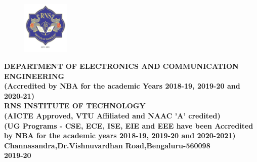 \begin{titlingpage}
\begin{figure}[h]
	\centering
	\includegraphics[height=2.5cm]{images/rns1.jpg}
\end{figure}

\begin{center}
\scriptsize\textbf{DEPARTMENT OF ELECTRONICS AND COMMUNICATION ENGINEERING}\\
\small\textbf{(Accredited by NBA for the academic Years 2018-19, 2019-20 and 2020-21)
\\
\vspace{0.5cm}
RNS INSTITUTE OF TECHNOLOGY\\
(AICTE Approved, VTU Affiliated and NAAC 'A' credited)\\
(UG Programs - CSE, ECE, ISE, EIE and EEE have been Accredited by NBA for the academic years 2018-19, 2019-20 and 2020-2021)\\
Channasandra,Dr.Vishnuvardhan Road,Bengaluru-560098\\
	 2019-20
}

\end{center}
\end{titlingpage}
